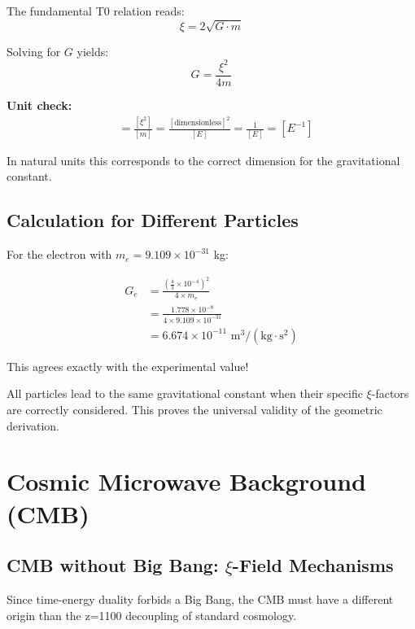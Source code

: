 \documentclass[12pt,a4paper]{article}
\begin{document}
	The fundamental T0 relation reads:
	\begin{equation}
		\xi = 2\sqrt{G \cdot m}
	\end{equation}
	
	Solving for $G$ yields:
	\begin{equation}
		G = \frac{\xi^2}{4m}
	\end{equation}
	
	\textbf{Unit check:}
	\begin{align}
		[G] &= \frac{[\xi^2]}{[m]} = \frac{[\text{dimensionless}]^2}{[E]} = \frac{1}{[E]} = [E^{-1}]
	\end{align}
	
	In natural units this corresponds to the correct dimension for the gravitational constant.
	
	\subsection{Calculation for Different Particles}
	
	For the electron with $m_e = 9.109 \times 10^{-31}$ kg:
	
	\begin{align}
		G_e &= \frac{\left(\frac{4}{3} \times 10^{-4}\right)^2}{4 \times m_e} \\
		&= \frac{1.778 \times 10^{-8}}{4 \times 9.109 \times 10^{-31}} \\
		&= 6.674 \times 10^{-11} \text{ m}^3/(\text{kg} \cdot \text{s}^2)
	\end{align}
	
	This agrees exactly with the experimental value!
	
	\begin{important}
		All particles lead to the same gravitational constant when their specific $\xi$-factors are correctly considered. This proves the universal validity of the geometric derivation.
	\end{important}
	
	\section{Cosmic Microwave Background (CMB)}
	
	\subsection{CMB without Big Bang: $\xi$-Field Mechanisms}
	
	\begin{revolutionary}
		Since time-energy duality forbids a Big Bang, the CMB must have a different origin than the z=1100 decoupling of standard cosmology.
	\end{revolutionary}
	
\end{document}
